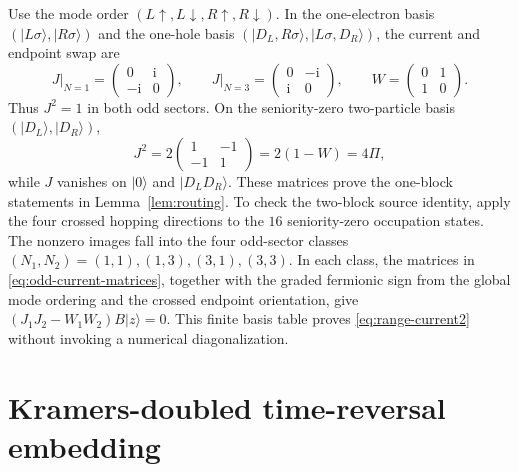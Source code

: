 \documentclass[11pt]{article}
\theoremstyle{definition}
\theoremstyle{remark}
\newcommand{\I}{\mathrm i}
\newcommand{\ket}[1]{\lvert #1\rangle}
\begin{document}
Use the mode order $(L\uparrow,L\downarrow,R\uparrow,R\downarrow)$.  In the one-electron basis $(\ket{L\sigma},\ket{R\sigma})$ and the one-hole basis $(\ket{D_L,R\sigma},\ket{L\sigma,D_R})$, the current and endpoint swap are
\begin{equation}
 J\big|_{N=1}=\begin{pmatrix}0&\I\\-\I&0\end{pmatrix},
 \qquad
 J\big|_{N=3}=\begin{pmatrix}0&-\I\\\I&0\end{pmatrix},
 \qquad
 W=\begin{pmatrix}0&1\\1&0\end{pmatrix}.
 \label{eq:odd-current-matrices}
\end{equation}
Thus $J^2=1$ in both odd sectors.  On the seniority-zero two-particle basis $(\ket{D_L},\ket{D_R})$,
\begin{equation}
 J^2=2\begin{pmatrix}1&-1\\-1&1\end{pmatrix}=2(1-W)=4\Pi,
 \label{eq:doublon-current-square}
\end{equation}
while $J$ vanishes on $\ket0$ and $\ket{D_LD_R}$.  These matrices prove the one-block statements in Lemma~\ref{lem:routing}.  To check the two-block source identity, apply the four crossed hopping directions to the $16$ seniority-zero occupation states.  The nonzero images fall into the four odd-sector classes $(N_1,N_2)=(1,1),(1,3),(3,1),(3,3)$.  In each class, the matrices in \eqref{eq:odd-current-matrices}, together with the graded fermionic sign from the global mode ordering and the crossed endpoint orientation, give $(J_1J_2-W_1W_2)B\ket z=0$.  This finite basis table proves \eqref{eq:range-current2} without invoking a numerical diagonalization.

\section{Kramers-doubled time-reversal embedding}
\label{app:kramers}
\end{document}

